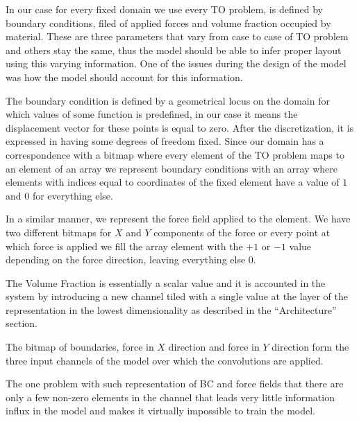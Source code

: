 In our case for every fixed domain we use every TO problem, is defined by boundary conditions, filed of applied forces and volume fraction occupied by material. 
These are three parameters that vary from case to case of TO problem and others stay the same, thus the model should be able to infer proper layout using this varying information.
One of the issues during the design of the model was how the model should account for this information.
\medskip

The boundary condition is defined by a geometrical locus on the domain for which values of some function is predefined, in our case it means the displacement vector for these points is equal to zero. 
After the discretization, it is expressed in having some degrees of freedom fixed. 
Since our domain has a correspondence with a bitmap where every element of the TO problem maps to an element of an array we represent boundary conditions with an array where elements with indices equal to coordinates of the fixed element have a value of $1$ and $0$ for everything else.
\medskip

In a similar manner, we represent the force field applied to the element.
We have two different bitmaps for $X$ and $Y$ components of the force or every point at which force is applied we fill the array element with the $+1$ or $-1$ value depending on the force direction, leaving everything else $0$.
\medskip

The Volume Fraction is essentially a scalar value and it is accounted in the system by introducing a new channel tiled with a single value at the layer of the representation in the lowest dimensionality as described in the ``Architecture'' section.
\medskip

The bitmap of boundaries, force in $X$ direction and force in $Y$ direction form the three input channels of the model over which the convolutions are applied.
\medskip

The one problem with such representation of BC and force fields that there are only a few non-zero elements in the channel that leads very little information influx in the model and makes it virtually impossible to train the model.
\medskip

